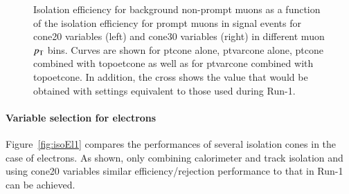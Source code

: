 \begin{figure}[phtb!]
\begin{center}
\end{center}
\vspace{-0.2cm}
\caption{Isolation efficiency for background non-prompt muons as a function of the isolation efficiency for prompt muons in signal events for cone20 variables (left) and cone30 variables (right) in different muon $p_{\mathrm{T}}$ bins. Curves are shown for ptcone alone, ptvarcone alone, ptcone combined with topoetcone as well as for ptvarcone combined with topoetcone. In addition, the cross shows the value that would be obtained with settings equivalent to those used during Run-1.}
\label{fig:isoMuon}
\end{figure}

\paragraph{Variable selection for electrons}

Figure~\ref{fig:isoEl1} compares the performances of several isolation cones in the case of electrons. As shown, only combining calorimeter and track isolation and using cone20 variables similar efficiency/rejection performance to that in Run-1 can be achieved.  
  
